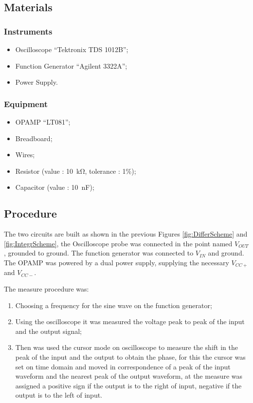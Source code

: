 \documentclass[a4paper, twocolumn]{article}
\begin{document}
\subsection{Materials}
\subsubsection{Instruments}
\begin{itemize}
    \item Oscilloscope ``Tektronix TDS 1012B'';
    \item Function Generator ``Agilent 3322A'';
    \item Power Supply.
\end{itemize}
\subsubsection{Equipment}
\begin{itemize}
    \item OPAMP ``LT081'';
    \item Breadboard;
    \item Wires;
    \item Resistor (value : \SI{10}{\kilo\ohm}, tolerance : 1\%);
    \item Capacitor (value : \SI{10}{\nano\farad});
\end{itemize}

\subsection{Procedure}

The two circuits are built as shown in the previous Figures \ref{fig:DifferScheme} and \ref{fig:IntegrScheme}, the Oscilloscope probe was connected in the point named \(V_{OUT}\), grounded to ground. The function generator was connected to \(V_{IN}\) and ground.   The OPAMP was powered by a dual power supply, supplying the necessary \(V_{CC+}\) and \(V_{CC-}\).

The measure procedure was:
\begin{enumerate}
    \item Choosing a frequency for the sine wave on the function generator;
    \item Using the oscilloscope it was measured the voltage peak to peak of the input and the output signal;
    \item Then was used the cursor mode on oscilloscope to measure the shift in the peak of the input and the output to obtain the phase, for this the cursor was set on time domain and moved in correspondence of a peak of the input waveform and the nearest peak of the output waveform, at the measure was assigned a positive sign if the output is to the right of input, negative if the output is to the left of input. 
\end{enumerate}
\end{document}
